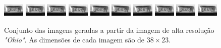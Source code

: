 \begin{figure}[H]
	\centering
	\caption{ Conjunto das imagens geradas a partir da imagem de alta resolução \emph{"Ohio"}.
	As dimensões de cada imagem são de $38 \times 23$.}
	\label{fig:frames2}
	\includegraphics{figures/degradedImg2/result-0.png}
	\includegraphics{figures/degradedImg2/result-1.png}
	\includegraphics{figures/degradedImg2/result-2.png}
	\includegraphics{figures/degradedImg2/result-3.png}
	\includegraphics{figures/degradedImg2/result-4.png}
	\includegraphics{figures/degradedImg2/result-5.png}
	\includegraphics{figures/degradedImg2/result-6.png}
	\includegraphics{figures/degradedImg2/result-7.png}
	\includegraphics{figures/degradedImg2/result-8.png}
	\includegraphics{figures/degradedImg2/result-9.png} 


\end{figure}

